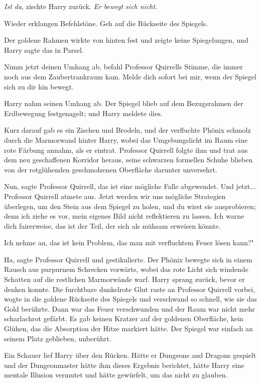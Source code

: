 \glqq{}\emph{Ist da}\grqq{}, zischte Harry zurück. \glqq{}\emph{Er bewegt sich
nicht.}\grqq{}

Wieder erklangen Befehlstöne. \glqq{}Geh auf die Rückseite des Spiegels.\grqq{}

Der goldene Rahmen wirkte von hinten fest und zeigte keine Spiegelungen, und
Harry sagte das in Parsel.

\glqq{}Nimm jetzt deinen Umhang ab\grqq{}, befahl Professor Quirrells Stimme, die
immer noch aus dem Zaubertrankraum kam. \glqq{}Melde dich sofort bei mir, wenn
der Spiegel sich zu dir hin bewegt.\grqq{}

Harry nahm seinen Umhang ab. Der Spiegel blieb auf dem Bezugsrahmen der
Erdbewegung festgenagelt; und Harry meldete dies.

Kurz darauf gab es ein Zischen und Brodeln, und der verfluchte Phönix schmolz
durch die Marmorwand hinter Harry, wobei das Umgebungslicht im Raum eine rote
Färbung annahm, als er eintrat. Professor Quirrell folgte ihm und trat aus dem
neu geschaffenen Korridor heraus, seine schwarzen formellen Schuhe blieben von
der rotglühenden geschmolzenen Oberfläche darunter unversehrt.

\glqq{}Nun\grqq{}, sagte Professor Quirrell, \glqq{}das ist eine mögliche Falle
abgewendet. Und jetzt...\grqq{} Professor Quirrell atmete aus. \glqq{}Jetzt
werden wir uns mögliche Strategien überlegen, um den Stein aus dem Spiegel zu
holen, und du wirst sie ausprobieren; denn ich ziehe es vor, mein eigenes Bild
nicht reflektieren zu lassen. Ich warne dich fairerweise, das ist der Teil, der
sich als mühsam erweisen könnte.\grqq{}

\glqq{}Ich nehme an, das ist kein Problem, das man mit verfluchtem Feuer lösen
kann?"

\glqq{}Ha\grqq{}, sagte Professor Quirrell und gestikulierte. Der Phönix bewegte
sich in einem Rausch aus purpurnem Schrecken vorwärts, wobei das rote Licht sich
windende Schatten auf die restlichen Marmorwände warf. Harry sprang zurück,
bevor er denken konnte. Die furchtbare dunkelrote Glut raste an Professor
Quirrell vorbei, wogte in die goldene Rückseite des Spiegels und verschwand so
schnell, wie sie das Gold berührte. Dann war das Feuer verschwunden und der Raum
war nicht mehr scharlachrot gefärbt. Es gab keinen Kratzer auf der goldenen
Oberfläche, kein Glühen, das die Absorption der Hitze markiert hätte. Der
Spiegel war einfach an seinem Platz geblieben, unberührt.

Ein Schauer lief Harry über den Rücken. Hätte er Dungeons and Dragons gespielt
und der Dungeonmaster hätte ihm dieses Ergebnis berichtet, hätte Harry eine
mentale Illusion vermutet und hätte gewürfelt, um das nicht zu glauben.

